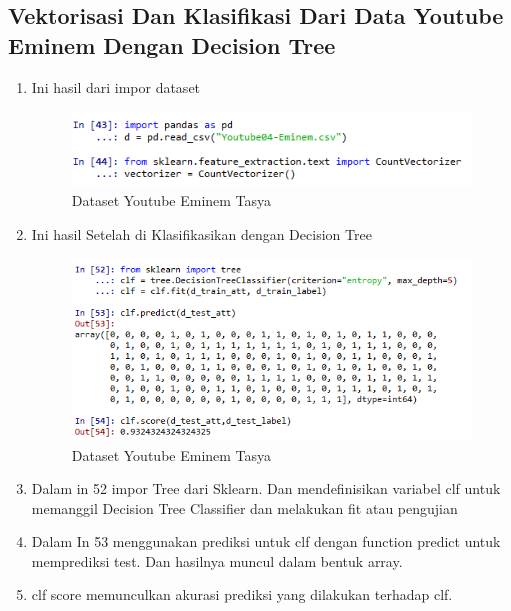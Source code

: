 \subsection{ Vektorisasi Dan Klasifikasi Dari Data Youtube Eminem Dengan Decision Tree}
\begin{enumerate}
\item Ini hasil dari impor dataset
\begin{figure}[ht]
\centering
\includegraphics[scale=0.5]{figures/praktektasya7.png}
\caption{Dataset Youtube Eminem Tasya}
\label{Praktek}
\end{figure}
\item Ini hasil Setelah di Klasifikasikan dengan Decision Tree
\begin{figure}[ht]
\centering
\includegraphics[scale=0.5]{figures/praktektasya6.png}
\caption{Dataset Youtube Eminem Tasya}
\label{Praktek}
\end{figure}
\item Dalam in 52 impor Tree dari Sklearn. Dan mendefinisikan variabel clf untuk memanggil Decision Tree Classifier dan melakukan fit atau pengujian
\item Dalam In 53 menggunakan prediksi untuk clf dengan function predict  untuk memprediksi test. Dan hasilnya muncul dalam bentuk array.
\item clf score memunculkan akurasi prediksi yang dilakukan terhadap clf.
\end{enumerate}

